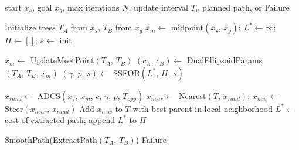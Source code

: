 \documentclass[11pt]{article}
\begin{document}
\begin{algorithm}
\caption{SC-RRT: Bidirectional Path Planning}
\begin{algorithmic}[1]
\Require start $x_s$, goal $x_g$, max iterations $N$, update interval $T_u$
\Ensure  planned path, or Failure

\State Initialize trees $T_A$ from $x_s$,\; $T_B$ from $x_g$
\State $x_m \leftarrow$ midpoint$(x_s,\, x_g)$;\; $L^* \leftarrow \infty$;\; $H \leftarrow []$;\; $s \leftarrow$ init

    \State $x_m \leftarrow$ UpdateMeetPoint$(T_A,\, T_B)$
    \State $(c_A,\, c_B) \leftarrow$ DualEllipsoidParams$(T_A,\, T_B,\, x_m)$
    \State $(\gamma,\, p,\, s) \leftarrow$ SSFOR$(L^*,\, H,\, s)$
  \EndIf

    \State $x_{rand} \leftarrow$ ADCS$(x_f,\, x_m,\, c,\, \gamma,\, p,\, T_{opp})$
    \State $x_{near} \leftarrow$ Nearest$(T,\, x_{rand})$;\;\;
           $x_{new} \leftarrow$ Steer$(x_{near},\, x_{rand})$
      \State Add $x_{new}$ to $T$ with best parent in local neighborhood
        \State $L^* \leftarrow$ cost of extracted path;\;\; append $L^*$ to $H$
      \EndIf
    \EndIf
  \EndFor
\EndFor

  \Return SmoothPath(ExtractPath$(T_A,\, T_B)$)
\Else
  \Return Failure
\EndIf
\end{algorithmic}
\end{algorithm}
\end{document}
